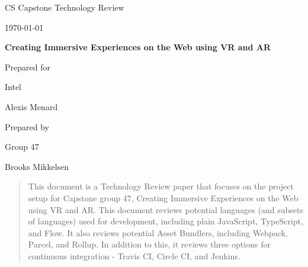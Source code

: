 \documentclass[onecolumn, draftclsnofoot,10pt, compsoc]{IEEEtran}
\def \CapstoneTeamName{WebXR Team}
\def \CapstoneTeamNumber{47}
\def \GroupMemberThree{Brooks Mikkelsen}
\def \CapstoneProjectName{Creating Immersive Experiences on the Web using VR and AR}
\def \CapstoneSponsorCompany{Intel}
\def \CapstoneSponsorPerson{Alexis Menard}
\def \DocType{		        %
				Technology Review
				}
\newcommand{\NameSigPair}[1]{\par
\makebox[2.75in][r]{#1} \hfil 	\makebox[3.25in]{\makebox[2.25in]{\hrulefill} \hfill		\makebox[.75in]{\hrulefill}}
\par\vspace{-12pt} \textit{\tiny\noindent
\makebox[2.75in]{} \hfil		\makebox[3.25in]{\makebox[2.25in][r]{Signature} \hfill	\makebox[.75in][r]{Date}}}}
\renewcommand{\NameSigPair}[1]{#1}
\begin{document}
\begin{titlepage}
    \begin{singlespace}
        \hfill 
        \par\vspace{.2in}
        \centering
        \scshape{
            \huge CS Capstone \DocType \par
            {\large\today}\par
            \vspace{.5in}
            \textbf{\Huge\CapstoneProjectName}\par
            \vfill
            {\large Prepared for}\par
            \Huge \CapstoneSponsorCompany\par
            \vspace{5pt}
            {\Large\NameSigPair{\CapstoneSponsorPerson}\par}
            {\large Prepared by }\par
            Group \CapstoneTeamNumber\par
            \vspace{5pt}
            {\Large
                \NameSigPair{\GroupMemberThree}\par
            }
            \vspace{20pt}
        }
        \begin{abstract}
        This document is a Technology Review paper that focuses on the project setup for Capstone group 47, Creating Immersive Experiences on the Web using VR and AR. This document reviews potential languages (and subsets of languages) used for development, including plain JavaScript, TypeScript, and Flow. It also reviews potential Asset Bundlers, including Webpack, Parcel, and Rollup. In addition to this, it reviews three options for continuous integration - Travis CI, Circle CI, and Jenkins.
        \end{abstract}     
    \end{singlespace}
\end{titlepage}
\newpage
{}
\tableofcontents
\clearpage
\end{document}
